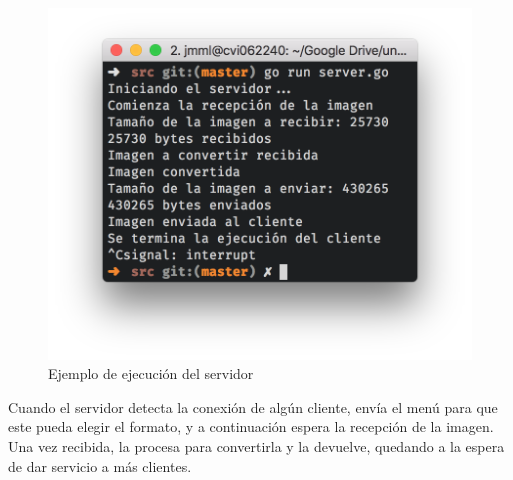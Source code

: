 \documentclass[11pt]{article}
\begin{document}
\begin{figure}[ht!]
	\centering
	\includegraphics[width=.5\textwidth]{img/servidor}
	\caption{Ejemplo de ejecución del servidor}
\end{figure}

Cuando el servidor detecta la conexión de algún cliente, envía el menú para que este pueda elegir el formato, y a continuación espera la recepción de la imagen. Una vez recibida, la procesa para convertirla y la devuelve, quedando a la espera de dar servicio a más clientes.
	
\end{document}
